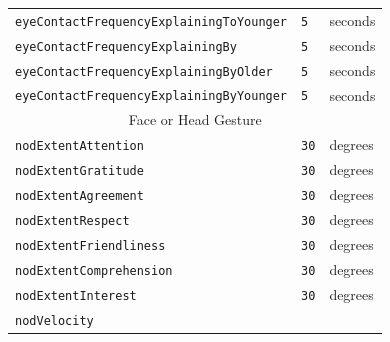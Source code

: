 \documentclass{CSSRforAfrica}
\begin{document}
\begin{table}[H]
\begin{center}
\begin{tabular}{|l l l|}
{\footnotesize \verb+eyeContactFrequencyExplainingToYounger+} 	& {\footnotesize \verb+5+} \vspace{-1.01mm} & {\footnotesize seconds } \\
{\footnotesize \verb+eyeContactFrequencyExplainingBy+} 	   & {\footnotesize \verb+5+} \vspace{-1.01mm} & {\footnotesize seconds } \\
{\footnotesize \verb+eyeContactFrequencyExplainingByOlder+} 	    & {\footnotesize \verb+5+} \vspace{-1.01mm} & {\footnotesize seconds } \\
{\footnotesize \verb+eyeContactFrequencyExplainingByYounger+} 	  & {\footnotesize \verb+5+} \vspace{-1.01mm} & {\footnotesize seconds } \\
\hline
\multicolumn{3}{|c|}{{\footnotesize Face or Head Gesture}}  \vspace{-0mm}\\
\hline
{\footnotesize \verb+nodExtentAttention+} 	                           & {\footnotesize \verb+30+ }\vspace{-1mm} & {\footnotesize degrees } \\
{\footnotesize \verb+nodExtentGratitude+} 	                            & {\footnotesize \verb+30+ }\vspace{-1mm} & {\footnotesize degrees } \\
{\footnotesize \verb+nodExtentAgreement+} 	                    & {\footnotesize \verb+30+ }\vspace{-1mm} & {\footnotesize degrees } \\
{\footnotesize \verb+nodExtentRespect+} 	                            & {\footnotesize \verb+30+ }\vspace{-1mm} & {\footnotesize degrees } \\
{\footnotesize \verb+nodExtentFriendliness+} 	                    & {\footnotesize \verb+30+ }\vspace{-1mm} & {\footnotesize degrees } \\
{\footnotesize \verb+nodExtentComprehension+} 	            & {\footnotesize \verb+30+ }\vspace{-1mm} & {\footnotesize degrees } \\
{\footnotesize \verb+nodExtentInterest+} 	                            & {\footnotesize \verb+30+ }\vspace{-1mm} & {\footnotesize degrees } \\
{\footnotesize \verb+nodVelocity+} 	                                 & {\footnotesize \verb++} & {\footnotesize  } \\

\end{tabular}
\end{center}
\end{table}
\end{document}
